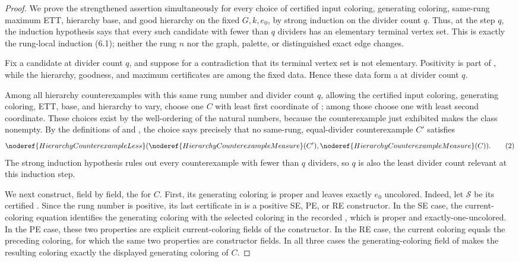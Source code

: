 \begin{proof}
We prove the strengthened assertion simultaneously for every choice of
certified input coloring, generating coloring, same-rung maximum ETT,
hierarchy base, and good hierarchy on the fixed \(G,k,e_0\), by strong
induction on the divider count \(q\).  Thus, at the step \(q\), the induction
hypothesis says that every such candidate with fewer than \(q\) dividers has
an elementary terminal vertex set.  This is exactly the rung-local induction
(6.1); neither the rung \(n\) nor the graph, palette, or distinguished exact
edge changes.

Fix a candidate at divider count \(q\), and suppose for a contradiction that
its terminal vertex set is not elementary.  Positivity is part of
, while the hierarchy, goodness, and maximum
certificates are among the fixed data.  Hence these data form a
 at divider count \(q\).

Among all hierarchy counterexamples with this same rung number and divider
count \(q\), allowing the certified input coloring, generating coloring,
ETT, base, and hierarchy to vary, choose one \(C\) with least first
coordinate of ; among those choose
one with least second coordinate.  These choices exist by the well-ordering
of the natural numbers, because the counterexample just exhibited makes the
class nonempty.  By the definitions of
 and
, the choice says precisely that no
same-rung, equal-divider counterexample \(C'\) satisfies
\[
 \noderef{HierarchyCounterexampleLess}
  (\noderef{HierarchyCounterexampleMeasure}(C'),
   \noderef{HierarchyCounterexampleMeasure}(C)).              \tag{2}
\]
The strong induction hypothesis rules out every counterexample with fewer
than \(q\) dividers, so \(q\) is also the least divider count relevant at
this induction step.

We next construct, field by field, the
 for \(C\).  First, its
generating coloring is proper and leaves exactly \(e_0\) uncolored.  Indeed,
let \(\mathcal S\) be its certified .  Since the
rung number is positive, its last certificate in
 is a positive SE, PE, or RE constructor.  In
the SE case, the current-coloring equation identifies the generating
coloring with the selected coloring in the recorded
, which is proper and
exactly-one-uncolored.  In the PE case, these two properties are explicit
current-coloring fields of the constructor.  In the RE case, the current
coloring equals the preceding coloring, for which the same two properties
are constructor fields.  In all three cases the generating-coloring field
of  makes the resulting coloring exactly the
displayed generating coloring of \(C\).


\end{proof}
